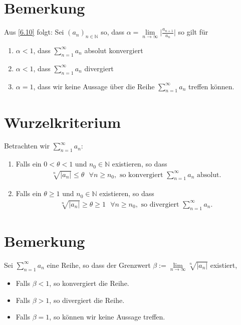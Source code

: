 \documentclass{scrreprt}
\newcommand{\NN}{\mathbb{N}}
\begin{document}
   	\section{Bemerkung}
   	Aus \ref{6.10} folgt: Sei $(a_n)_{n \in \NN}$ so, dass $\alpha = \lim\limits_{n \to \infty} \vert \frac{a_{n+1}}{a_n}\vert$ so gilt für
   	\begin{enumerate}
   		\item
   		$\alpha < 1$, dass $\sum\limits_{n=1}^\infty a_n$ absolut konvergiert
   		\item
   		$\alpha < 1$, dass $\sum\limits_{n=1}^\infty a_n$ divergiert
   		\item
   		$\alpha = 1$, dass wir keine Aussage über die Reihe $\sum\limits_{n=1}^\infty a_n$ treffen können.
   	\end{enumerate}

   	\section{Wurzelkriterium}
   	Betrachten wir $\sum\limits_{n = 1}^\infty a_n$:
   	\begin{enumerate}
   	\item
   	Falls ein $0 < \theta < 1$ und $n_0 \in \NN$ existieren, so dass 
   	\begin{align*}
   		\sqrt[n]{\vert a_n \vert} \leq \theta ~~~ \forall n \geq n_0, \text{ so konvergiert $\sum\limits_{n=1}^\infty a_n$ absolut.}
   	\end{align*}
   	\item
   	Falls ein $\theta \geq 1$ und $n_0 \in \NN$ existieren, so dass 
   	\begin{align*}
   		\sqrt[n]{\vert a_n \vert} \geq \theta \geq 1 ~~~ \forall n \geq n_0, \text{ so divergiert $\sum\limits_{n=1}^\infty a_n$.}
   	\end{align*}
   	\end{enumerate}

   	\section{Bemerkung}
   	Sei $\sum\limits_{n=1}^\infty a_n$ eine Reihe, so dass der Grenzwert $\beta := \lim\limits_{n \to \infty} \sqrt[n]{\vert a_n \vert}$ existiert,
   	\begin{itemize}
   		\item
   		Falls $\beta < 1$, so konvergiert die Reihe.
   		\item
   		Falls $\beta > 1$, so divergiert die Reihe.
   		\item
   		Falls $\beta = 1$, so können wir keine Aussage treffen.
   	\end{itemize}
\end{document}
